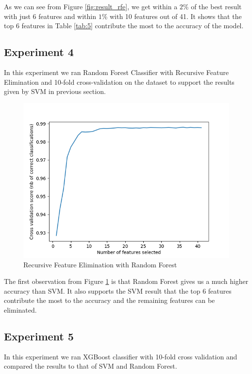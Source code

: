 As we can see from Figure \ref{fig:result_rfe}, we get within a $2$\% of the best result with just 6 features and within $1$\% with 10 features out of 41. It shows that the top 6 features in Table \ref{tab:5} contribute the most to the accuracy of the model.

\subsection{Experiment 4}

In this experiment we ran Random Forest Classifier with Recursive Feature Elimination and 10-fold cross-validation on the dataset to support the results given by SVM in previous section.

\begin{figure}[htb]
	\centering
	\includegraphics[width=1\textwidth]{images/rf_rfe.png}
	\caption{Recursive Feature Elimination with Random Forest} 
	\label{fig:result_rf_rfe}
\end{figure}

The first observation from Figure \ref{fig:result_rf_rfe} is that Random Forest gives us a much higher accuracy than SVM. It also supports the SVM result that the top 6 features contribute the most to the accuracy and the remaining features can be eliminated.

\subsection{Experiment 5}

In this experiment we ran XGBoost classifier with 10-fold cross validation and compared the results to that of SVM and Random Forest.


